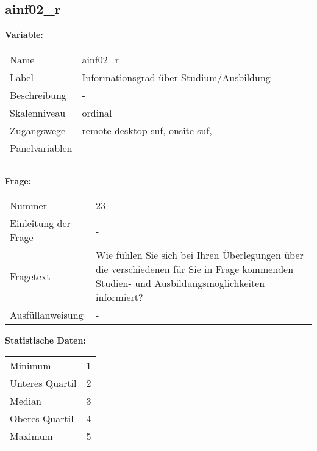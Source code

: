 	
	
	\subsection{ainf02\_r}
	\label{subSection:ainf02_r}

	\noindent\textbf{Variable:}\\
		\begin{tabular}{lL{11.3cm}}
			\label{tableVariable:ainf02_r}
			Name & ainf02\_r \\
			Label & Informationsgrad über Studium/Ausbildung \\
			Beschreibung & - \\
			Skalenniveau & ordinal \\
			Zugangswege &
				remote-desktop-suf,
				onsite-suf,
 \\
			Panelvariablen & -
			 \\
			 \\
 \\
		\end{tabular}

		\vspace*{1 cm}
		\noindent\textbf{Frage:}\\
		\begin{tabular}{lL{11.3cm}}
			\label{tableQuestion:ainf02_r}
			Nummer & 23 \\
			Einleitung der Frage & - \\
			Fragetext & Wie fühlen Sie sich bei Ihren Überlegungen über die verschiedenen für Sie in Frage kommenden Studien- und Ausbildungsmöglichkeiten informiert? \\
			Ausfüllanweisung & - \\
		\end{tabular}


		\vspace*{1 cm}
		\noindent\textbf{Statistische Daten:}\\
			\begin{tabular}{ll}
				\label{tableStatistics:ainf02_r}
					Minimum & 1 \\
					Unteres Quartil & 2 \\
					Median & 3 \\
					Oberes Quartil & 4 \\
					Maximum & 5 \\
			\end{tabular}




